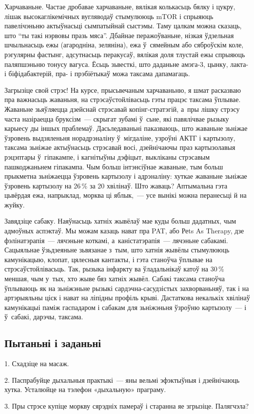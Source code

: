 Харчаваньне. Частае дробавае харчаваньне, вялікая колькасьць бялку і цукру, лішак высокаглікемічных вугляводаў стымулююць mTOR і спрыяюць павелічэньню актыўнасьці сымпатыйнай сыстэмы. Таму цалкам можна сказаць, што ``ты такі нэрвовы празь мяса''. Дбайнае перажоўваньне, нізкая ўдзельная шчыльнасьць ежы (агародніна, зеляніна), ежа ў~сямейным або сяброўскім коле, рэгулярны фастынг, адсутнасьць перакусаў, вялікая доля тлустай ежы спрыяюць паляпшэньню тонусу вагуса. Ёсьць зьвесткі, што даданьне амэга-3, цынку, лакта- і біфідабактерій, пра- і прэбіётыкаў можа таксама дапамагаць.

Загрызіце свой стрэс! На курсе, прысьвечаным харчаваньню, я шмат расказваю пра важнасьць жаваньня, на стрэсаўстойлівасьць гэты працэс таксама ўплывае. Жаваньне зьяўляецца дзейснай стрэсавай копінг-стратэгій, а~пры лішку стрэсу часта назіраецца бруксізм~--- скрыгат зубамі ў~сьне, які павялічвае рызыку карыесу ды іншых праблемаў. Дасьледаваньні паказваюць, што жаваньне зьніжае ўзровень выдзяленьня норадрэналіну ў~мігдаліне, узроўні АКТГ і картызолу, таксама зьніжае актыўнасьць стрэсавай восі, дзейнічаючы праз картызолавыя рэцэптары ў~гіпакампе, і кагнітыўны дэфіцыт, выкліканы стрэсавым пашкоджаньнем гіпакампа. Чым больш інтэнсіўнае жаваньне, тым больш прыкметна зьніжаецца ўзровень картызолу і адрэналіну: хуткае жаваньне зьніжае ўзровень картызолу на 26\,\% за 20 хвілінаў. Што жаваць? Аптымальна гэта цьвёрдая ежа, напрыклад, морква ці яблык,~--- усе вынікі можна перанесьці й на жуйку.

Завядзіце сабаку. Наяўнасьць хатніх жывёлаў мае куды больш дадатных, чым адмоўных аспэктаў. Мы можам казаць нават пра PAT, або Реts As Therapy, дзе фэлінатэрапія~--- лячэньне коткамі, а~каністатэрапія~--- лячэньне сабакамі. Сацыяльнае ўзьдзеяньне зьвязанае з~тым, што хатнія жывёлы стымулююць камунікацыю, клопат, цялесныя кантакты, і гэта станоўча ўплывае на стрэсаўстойлівасьць. Так, рызыка інфаркту ва ўладальнікаў катоў на 30\,\% меншая, чым у~тых, хто жыве бяз хатніх жывёл. Сабакі таксама станоўча ўплываюць як на зьніжэньне рызыкі сардэчна-сасудзістых захворваньняў, так і на артэрыяльны ціск і нават на ліпідны профіль крыві. Дастаткова некалькіх хвілінаў камунікацыі паміж гаспадаром і сабакам для зьніжэньня ўзроўню картызолу~--- і ў~сабакі, дарэчы, таксама.

\subsection*{Пытаньні і заданьні}

1. Схадзіце на масаж.

2. Паспрабуйце дыхальныя практыкі~--- яны вельмі эфэктыўныя і дзейнічаюць хутка. Усталюйце на тэлефон «дыхальную» праграму.

3. Пры стрэсе купіце моркву сярэдніх памераў і старанна яе згрызіце. Палягчэла?

